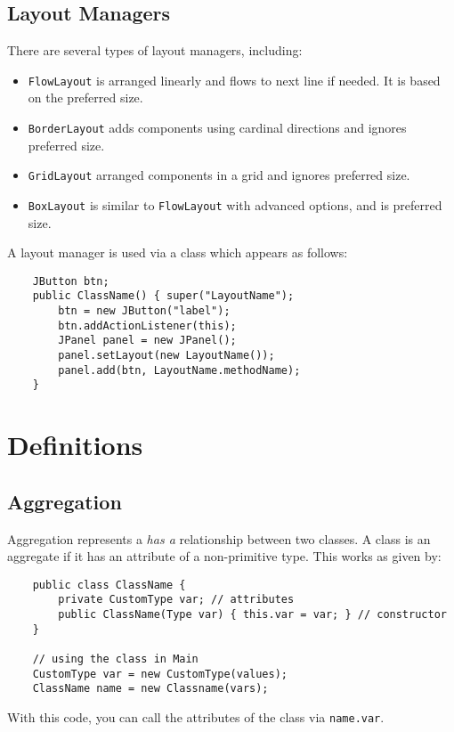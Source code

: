 \documentclass[letterpaper, openany, justified]{tufte-book}
\newcommand{\cd}[1]{\lstinline{#1}}
\begin{document}
\begin{fullwidth}
\section{Layout Managers}
There are several types of layout managers, including:
\begin{itemize}
    \item \cd{FlowLayout} is arranged linearly and flows to next line if needed. It is based on the preferred size.
    \item \cd{BorderLayout} adds components using cardinal directions and ignores preferred size.
    \item \cd{GridLayout} arranged components in a grid and ignores preferred size.
    \item \cd{BoxLayout} is similar to \cd{FlowLayout} with advanced options, and is preferred size.
\end{itemize}
A layout manager is used via a class which appears as follows:
\begin{lstlisting}
    JButton btn;
    public ClassName() { super("LayoutName");
        btn = new JButton("label");
        btn.addActionListener(this);
        JPanel panel = new JPanel();
        panel.setLayout(new LayoutName());
        panel.add(btn, LayoutName.methodName);
    }
\end{lstlisting}

\chapter{Definitions}

\section{Aggregation}
Aggregation represents a \textit{has a} relationship between two classes. A class is an aggregate if it has an attribute of a non-primitive type. This works as given by:
\begin{lstlisting}
    public class ClassName {
        private CustomType var; // attributes
        public ClassName(Type var) { this.var = var; } // constructor
    }

    // using the class in Main
    CustomType var = new CustomType(values);
    ClassName name = new Classname(vars);
\end{lstlisting}
With this code, you can call the attributes of the class via \cd{name.var}.

\end{fullwidth}
\end{document}
